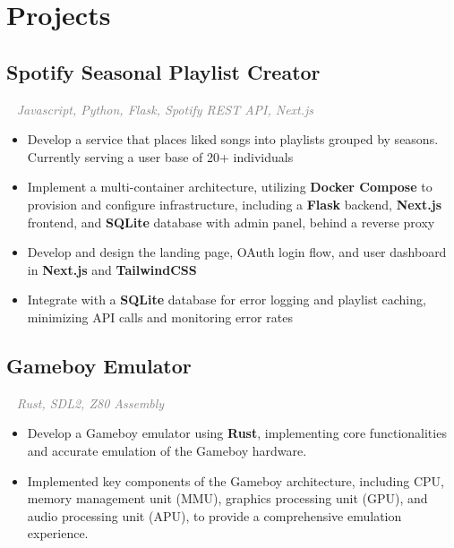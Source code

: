\documentclass{article}
\newcommand{\resumesection}[3]{
    \subsection*{#1}
    \ 
    \normalsize
    \normalsize
    \hfill
    \textcolor{black}{#3}
    \normalsize
    \newline
    \small
    \textcolor{grey}{\emph{#2}}
}
\begin{document}
\section*{Projects}
\resumesection{Spotify Seasonal Playlist Creator}{Javascript, Python, Flask, Spotify REST API, Next.js}{}
\begin{itemize}
    \item Develop a service that places liked songs into playlists grouped by seasons. Currently serving a user base of 20+ individuals
    \item Implement a multi-container architecture, utilizing \textbf{Docker Compose} to provision and configure infrastructure, including a \textbf{Flask} backend, \textbf{Next.js} frontend, and \textbf{SQLite} database with admin panel, behind a reverse proxy
    \item Develop and design the landing page, OAuth login flow, and user dashboard in \textbf{Next.js} and \textbf{TailwindCSS}
    \item Integrate with a \textbf{SQLite} database for error logging and playlist caching, minimizing API calls and monitoring error rates
\end{itemize}
\resumesection{Gameboy Emulator}{Rust, SDL2, Z80 Assembly}{}
\begin{itemize}
    \item Develop a Gameboy emulator using \textbf{Rust}, implementing core functionalities and accurate emulation of the Gameboy hardware.
    \item Implemented key components of the Gameboy architecture, including CPU, memory management unit (MMU), graphics processing unit (GPU), and audio processing unit (APU), to provide a comprehensive emulation experience.
\end{itemize}
\end{document}

